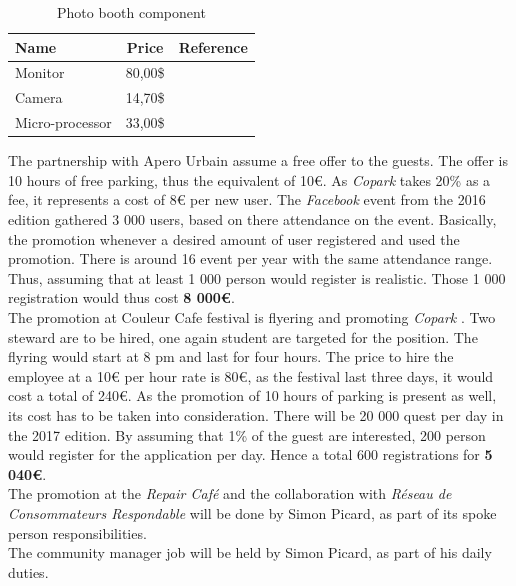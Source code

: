 \documentclass[12pt,a4paper,oneside]{book}
\newcommand{\bp}{\textit{Copark }}
\begin{document}
\begin{table}[h]
\centering
\caption{Photo booth component}
\label{pbcom}
\begin{tabular}{|l|c|c|}
\hline
\textbf{Name}   & \textbf{Price} & \textbf{Reference} \\ \hline
Monitor         & 80,00\$         & \cite{abmon}    \\ \hline
Camera          & 14,70\$         & \cite{abcam}     \\ \hline
Micro-processor & 33,00\$         & \cite{abmc}     \\ \hline
\end{tabular}
\end{table}

The partnership with Apero Urbain assume a free offer to the guests. The offer is 10 hours of free parking, thus the equivalent of 10\euro{}. As \bp takes 20\% as a fee, it represents a cost of 8\euro{} per new user. The \textit{Facebook} event from the 2016 edition gathered 3 000 users, based on there attendance on the event.\cite{fbau} Basically, the promotion whenever a desired amount of user registered and used the promotion. There is around 16 event per year with the same attendance range. Thus, assuming that at least 1 000 person would register is realistic. Those 1 000 registration would thus cost \textbf{8 000\euro{}}.\\


The promotion at Couleur Cafe festival is flyering and promoting \bp. Two steward are to be hired, one again student are targeted for the position. The flyring would start at 8 pm and last for four hours. The price to hire the employee at a 10\euro{} per hour rate is 80\euro{}, as the festival last three days, it would cost a total of 240\euro{}. As the promotion of 10 hours of parking is present as well, its cost has to be taken into consideration. There will be 20 000 quest per day in the 2017 edition. By assuming that 1\% of the guest are interested, 200 person would register for the application per day. Hence a total 600 registrations for \textbf{5 040\euro{}}.\\

The promotion at the \textit{Repair Café} and the collaboration with \textit{Réseau de Consommateurs Respondable} will be done by Simon Picard, as part of its spoke person responsibilities.\\

The community manager job will be held by Simon Picard, as part of his daily duties.\\
\end{document}

